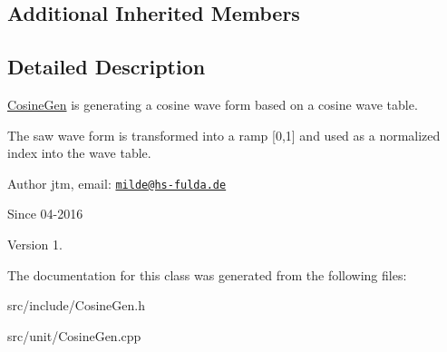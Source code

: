 \subsection*{Additional Inherited Members}


\subsection{Detailed Description}
\hyperlink{classunit_1_1CosineGen}{Cosine\-Gen} is generating a cosine wave form based on a cosine wave table.

The saw wave form is transformed into a ramp \mbox{[}0,1\mbox{]} and used as a normalized index into the wave table.

\begin{DoxyAuthor}{Author}
jtm, email\-:  \href{mailto:milde@hs-fulda.de}{\tt milde@hs-\/fulda.\-de} 
\end{DoxyAuthor}
\begin{DoxySince}{Since}
04-\/2016 
\end{DoxySince}
\begin{DoxyVersion}{Version}
1. 
\end{DoxyVersion}


The documentation for this class was generated from the following files\-:\begin{DoxyCompactItemize}
\item 
src/include/Cosine\-Gen.\-h\item 
src/unit/Cosine\-Gen.\-cpp\end{DoxyCompactItemize}

